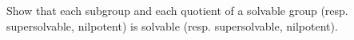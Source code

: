Show that each subgroup and each quotient of a solvable group (resp. supersolvable, nilpotent) is solvable (resp. supersolvable, nilpotent).
